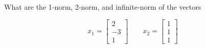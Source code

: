 \item [3.2] What are the 1-norm, 2-norm, and infinite-norm of the vectors

\begin{equation*}
 x_1 = \begin{bmatrix}
      2\\
      -3\\
      1
     \end{bmatrix}
\qquad
x_2 = \begin{bmatrix}
      1\\
      1\\
      1
     \end{bmatrix}
\end{equation*}
